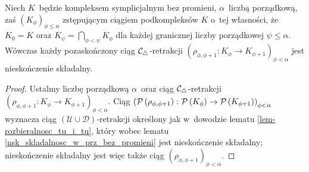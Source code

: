 \begin{lem}\label{nsk_skladalnosc_w_kompl_bez_promieni}
Niech $K$~będzie kompleksem symplicjalnym bez promieni, $\alpha$~liczbą porządkową, zaś $\left(K_\phi\right)_{\phi\leq\alpha}$ zstępującym ciągiem podkompleksów $K$ o~tej własności, że $K_0=K$ oraz $K_{\psi}=\bigcap_{\phi<\psi}K_{\phi}$ dla każdej granicznej liczby porządkowej $\psi\leq\alpha$. Wówczas każdy pozaskończony ciąg $\mathcal{C}_\triangle$-retrakcji $\left(\rho_{\phi,\phi+1}\colon K_\phi\to K_{\phi+1}\right)_{\phi<\alpha}$ jest nieskończenie składalny.
\end{lem}
\begin{proof}
Ustalmy liczbę porządkową $\alpha$~oraz ciąg $\mathcal{C}_\triangle$-retrakcji $\left(\rho_{\phi,\phi+1}\colon K_\phi\to K_{\phi+1}\right)_{\phi<\alpha}$. Ciąg $\left(\mathcal{P}\left(\rho_{\phi,\phi+1}\right)\colon \mathcal{P}\left(K_\phi\right)\to \mathcal{P}\left(K_{\phi+1}\right)\right)_{\phi<\alpha}$ wyznacza ciąg $(\mathcal{U}\cup\mathcal{D})$-retrakcji określony jak w~dowodzie lematu \ref{lem-rozbieralnosc_tu_i_tu}, który wobec lematu \ref{nsk_skladalnosc_w_prz_bez_promieni} jest nieskończenie składalny; nieskończenie składalny jest więc także ciąg $(\rho_{\phi,\phi+1})_{\phi<\alpha}$.
\end{proof}

\begin{comment}
Jako wniosek z~dowodu otrzymujemy następujący lemat.
\begin{lem}\label{lem-mctriang_rozbieralnosc_implikuje_mitriang_rozbieralnosc}
Dla kompleksu symplicjalnego $K$~bez nieskończonych sympleksów oraz jego podkompleksu $L$~jeżeli $K\dism L$, to $\mK(\mP(K))$~jest $\mItriang$-rozbieralny do $\mK(\mP(L))$.
\end{compactenum}
\end{lem}
\begin{proof}
Jeżeli $K\dism L$, to ze stwierdzenia \ref{stw-rozbieralnosc_tu_i_tu} zachodzi $\mP(K)\dism \mP(L)$. Ponieważ $K$~nie zawiera nieskończonego sympleksu, $\mP(K)$ nie zawiera nieskończonego łańcucha. Wobec lematu \ref{lem-Irozbieralny-wtw-Crozbieralny} przestrzeń $\mP(K)$~jest $\mathcal{I}$-rozbieralna do $\mP(L)$. Jak w~dowodzie stwierdzenia \ref{stw-rozbieralnosc_tu_i_tu} wykazujemy, że kompleks $\mK(\mP(K))$ jest $\mItriang$-rozbieralny do $\mK(\mP(L))$.
\end{proof}
\end{comment}

